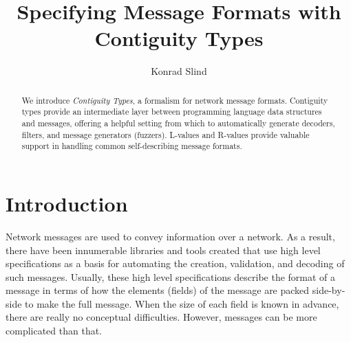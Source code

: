 \documentclass[svgnames]{llncs}
\begin{document}

\title{Specifying Message Formats with \\ Contiguity Types}

\author{Konrad Slind}
\maketitle

\begin{abstract}
We introduce \emph{Contiguity Types}, a formalism for network message
formats. Contiguity types provide an intermediate layer between
programming language data structures and messages, offering a helpful
setting from which to automatically generate decoders, filters, and
message generators (fuzzers). L-values and R-values provide valuable
support in handling common self-describing message formats.
\end{abstract}



\section{Introduction}\label{sec:intro}

Network messages are used to convey information over a network. As a
result, there have been innumerable libraries and tools created that
use high level specifications as a basis for automating the creation,
validation, and decoding of such messages. Usually, these high level
specifications describe the format of a message in terms of how the
elements (fields) of the message are packed side-by-side to make the
full message. When the size of each field is known in advance, there
are really no conceptual difficulties. However, messages can be more
complicated than that.
\end{document}
